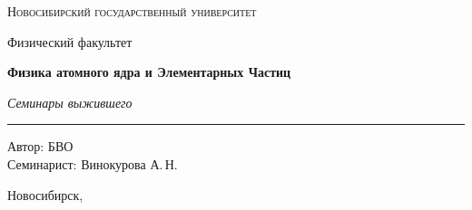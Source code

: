 \documentclass[12pt,a4paper]{report}
\begin{document}
\hypersetup{pageanchor=false}
\begin{titlepage}
    \thispagestyle{empty}

    \begin{center}
        \vspace*{1.5cm}

        {\Large\scshape Новосибирский государственный университет\par}
        \vspace{0.25cm}
        {\large Физический факультет\par}

        \vfill

        {\Huge\bfseries Физика атомного ядра и Элементарных Частиц\par}

        \vspace{0.45cm}

        {\Large\itshape Семинары выжившего\par}

        \vspace{0.8cm}

        \rule{0.72\linewidth}{0 pt}





        \vfill

        \begin{flushright}
            \large
            Автор: БВО\\[0.25cm]
            Семинарист: Винокурова А.\,Н.
        \end{flushright}

        \vspace{1.2cm}

        {\large Новосибирск, \the\year}

    \end{center}
\end{titlepage}
\hypersetup{pageanchor=true}

\tableofcontents
\newpage



\clearpage

\clearpage

\clearpage

\clearpage

\clearpage

\clearpage

\clearpage

\clearpage

\clearpage
\end{document}
